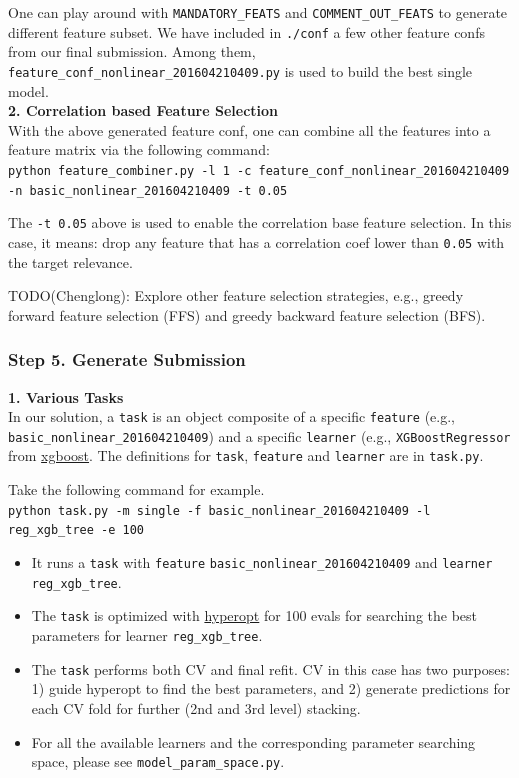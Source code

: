 \documentclass[12pt]{article}
\begin{document}
{{\begin{appendices}
One can play around with \texttt{MANDATORY\_FEATS} and \texttt{COMMENT\_OUT\_FEATS} to generate different feature subset. We have included in \texttt{./conf} a few other feature confs from our final submission. Among them, \texttt{feature\_conf\_nonlinear\_201604210409.py} is used to build the best single model.\\
\textbf{2. Correlation based Feature Selection}\\
With the above generated feature conf, one can combine all the features into a feature matrix via the following command:\\
\texttt{python feature\_combiner.py -l 1 -c feature\_conf\_nonlinear\_201604210409 -n basic\_nonlinear\_201604210409 -t 0.05}

The \texttt{-t 0.05} above is used to enable the correlation base feature selection. In this case, it means: drop any feature that has a correlation coef lower than \texttt{0.05} with the target relevance.

TODO(Chenglong): Explore other feature selection strategies, e.g., greedy forward feature selection (FFS) and greedy backward feature selection (BFS).

\subsubsection{Step 5. Generate Submission}
\label{subsubsec:GenerateSubmission}
\textbf{1. Various Tasks}\\
In our solution, a \texttt{task} is an object composite of a specific \texttt{feature} (e.g., \texttt{basic\_nonlinear\_201604210409}) and a specific \texttt{learner} (e.g., \texttt{XGBoostRegressor} from \href{https://github.com/dmlc/xgboost}{xgboost}. The definitions for \texttt{task}, \texttt{feature} and \texttt{learner} are in \texttt{task.py}.

Take the following command for example.\\
\texttt{python task.py -m single -f basic\_nonlinear\_201604210409 -l reg\_xgb\_tree -e 100}
\begin{itemize}
\item It runs a \texttt{task} with \texttt{feature} \texttt{basic\_nonlinear\_201604210409} and \texttt{learner} \texttt{reg\_xgb\_tree}.
\item The \texttt{task} is optimized with \href{https://github.com/hyperopt/hyperopt}{hyperopt} for 100 evals for searching the best parameters for learner \texttt{reg\_xgb\_tree}.
\item The \texttt{task} performs both CV and final refit. CV in this case has two purposes: 1) guide hyperopt to find the best parameters, and 2) generate predictions for each CV fold for further (2nd and 3rd level) stacking.
\item For all the available learners and the corresponding parameter searching space, please see \texttt{model\_param\_space.py}.
\end{itemize}


\end{appendices}}}
\end{document}
